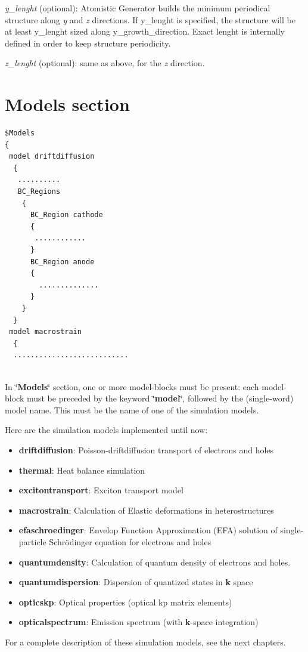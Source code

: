 \textit{y\_lenght} (optional): Atomistic Generator builds the minimum periodical structure along \textit{y} and \textit{z} directions.
If y\_lenght is specified, the structure will be at least y\_lenght sized along y\_growth\_direction. Exact lenght is internally defined
in order to keep structure periodicity.

\textit{z\_lenght} (optional): same as above, for the \textit{z} direction.
  





\section{Models section }


\label{section:models}
 




\begin{verbatim}
$Models
{ 
 model driftdiffusion
  { 
   ..........
   BC_Regions  
    {
      BC_Region cathode
      {
       ............
      }
      BC_Region anode
      {
        ..............
      }
    }   
  } 
 model macrostrain
  { 
  ...........................
 
\end{verbatim}




   In \char`\"{}\textbf{Models}\char`\"{} section, one or more  model-blocks must be present: each model-block must be preceded by the keyword \char`\"{}\textbf{model}\char`\"{}, followed by the (single-word) model name. 
 This must be the   name of  one of the  \TiberCAD{}  simulation models.
 
Here are the simulation models implemented until now: 

 \begin{itemize}
\item 
\textbf{driftdiffusion}: Poisson-driftdiffusion transport  of  electrons  and  holes
\item \textbf{thermal}:  Heat balance simulation
 \item \textbf{excitontransport}: Exciton transport  model
\item \textbf{macrostrain}: Calculation of Elastic  deformations in  heterostructures
\item \textbf{efaschroedinger}: Envelop Function Approximation (EFA) solution of single-particle Schr\"odinger equation for electrons and holes
\item \textbf{quantumdensity}: Calculation of  quantum density of electrons  and  holes.
\item \textbf{quantumdispersion}: Dispersion of  quantized states in  \textbf{k} space 
\item  \textbf{opticskp}: Optical properties (optical kp matrix elements)
\item  \textbf{opticalspectrum}: Emission spectrum (with \textbf{k}-space integration)
\end{itemize}
For a  complete description of  these  simulation models,  see  the  next  chapters.



